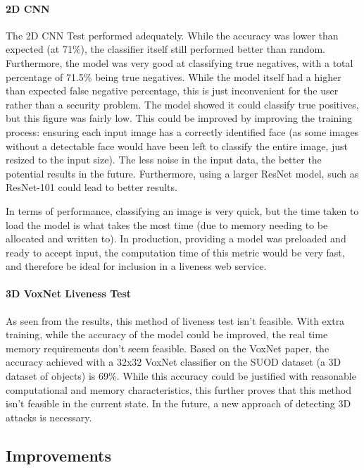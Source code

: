 \documentclass[11pt,a4paper]{article}
\begin{document}
        \paragraph{2D CNN}
            The 2D CNN Test performed adequately. While the accuracy was lower than expected (at 71\%), the classifier itself still performed better than random.
            Furthermore, the model was very good at classifying true negatives, with a total percentage of 71.5\% being true negatives. While the model itself had
            a higher than expected false negative percentage, this is just inconvenient for the user rather than a security problem. The model showed it could classify true
            positives, but this figure was fairly low. This could be improved by improving the training process: ensuring each input image has a correctly identified face (as
            some images without a detectable face would have been left to classify the entire image, just resized to the input size). The less noise in the input data, the better the potential
            results in the future. Furthermore, using a larger ResNet model, such as ResNet-101 could lead to better results.

            In terms of performance, classifying an image is very quick, but the time taken to load the model is what takes the most time (due to memory needing to be allocated and written to).
            In production, providing a model was preloaded and ready to accept input, the computation time of this metric would be very fast, and therefore be ideal for inclusion in a liveness web service.
        \paragraph{3D VoxNet Liveness Test}
            As seen from the results, this method of liveness test isn't feasible. With extra training, while the accuracy of the model could be improved, the
            real time memory requirements don't seem feasible. Based on the VoxNet paper, the accuracy achieved with a 32x32 VoxNet classifier on the SUOD dataset (a 3D dataset of objects)
            is 69\%. While this accuracy could be justified with reasonable computational and memory characteristics, this further proves that this method isn't feasible in the current state. In the future, a new approach of detecting 3D attacks is necessary.
    \subsection{Improvements}
\end{document}
